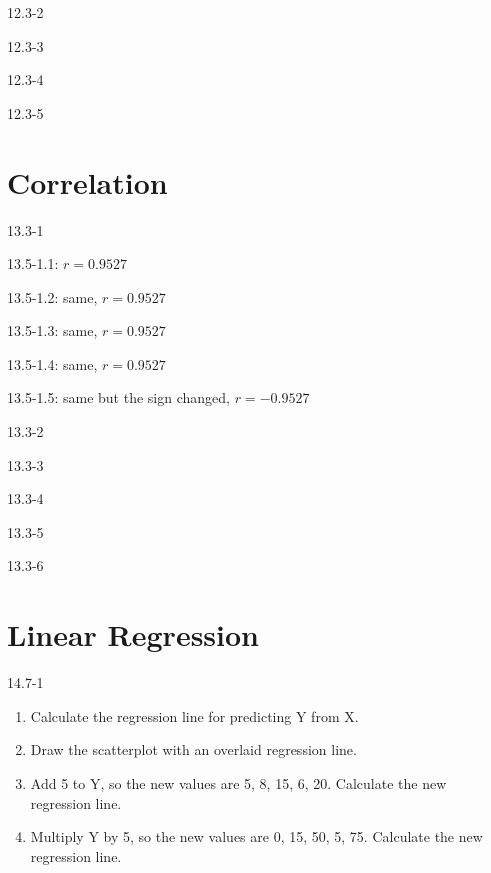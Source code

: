 \begin{exsol@solution}{12.3-2}
\end{exsol@solution}
\begin{exsol@solution}{12.3-3}
\end{exsol@solution}
\begin{exsol@solution}{12.3-4}
\end{exsol@solution}
\begin{exsol@solution}{12.3-5}
\end{exsol@solution}
\setcounter{chapter}{13}\chapter{Correlation}
\begin{exsol@solution}{13.3-1}


13.5-1.1: $r = 0.9527 $

13.5-1.2: same, $r = 0.9527 $

13.5-1.3: same, $r = 0.9527 $

13.5-1.4: same, $r = 0.9527 $

13.5-1.5: same but the sign changed, $r = -0.9527 $

\end{exsol@solution}
\begin{exsol@solution}{13.3-2}
\end{exsol@solution}
\begin{exsol@solution}{13.3-3}
\end{exsol@solution}
\begin{exsol@solution}{13.3-4}
\end{exsol@solution}
\begin{exsol@solution}{13.3-5}
\end{exsol@solution}
\begin{exsol@solution}{13.3-6}
\end{exsol@solution}
\setcounter{chapter}{14}\chapter{Linear Regression}
\begin{exsol@solution}{14.7-1}
\begin{enumerate}
  \item Calculate the regression line for predicting Y from X.
  \item Draw the scatterplot with an overlaid regression line.
  \item Add 5 to Y, so the new values are 5, 8, 15, 6, 20.  Calculate the new regression line.
  \item Multiply Y by 5, so the new values are 0, 15, 50, 5, 75.  Calculate the new regression line.
\end{enumerate}

\end{exsol@solution}
